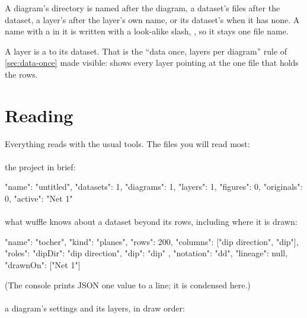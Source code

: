 A diagram's directory is named after the diagram, a dataset's files after the dataset, a layer's after the
layer's own name, or its dataset's when it has none. A name with a \file{/} in it is written with a
look-alike slash, , so it stays one file name.

A layer is a  to its dataset. That is the \enquote{data once, layers
per diagram} rule of \cref{sec:data-once} made visible:  shows every layer pointing at the one
file that holds the rows.


\section{Reading}\label{sec:project-read}

Everything reads with the usual tools. The files you will read most:

\paragraph{} the project in brief:

\begin{codeblock}
{
  "name": "untitled",
  "datasets": 1,
  "diagrams": 1,
  "layers": 1,
  "figures": 0,
  "originals": 0,
  "active": "Net 1"
}
\end{codeblock}

\paragraph{} what wuffle knows about a dataset beyond its rows, including where it
is drawn:

\begin{codeblock}
{
  "name": "tocher",
  "kind": "planes",
  "rows": 200,
  "columns": ["dip direction", "dip"],
  "roles": { "dipDir": "dip direction", "dip": "dip" },
  "notation": "dd",
  "lineage": null,
  "drawnOn": ["Net 1"]
}
\end{codeblock}

(The console prints JSON one value to a line; it is condensed here.)

\paragraph{} a diagram's settings and its layers, in draw order:

